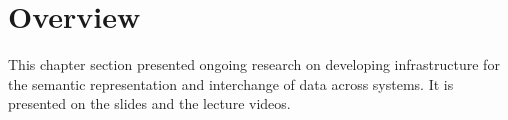 \section{Overview}

This chapter section presented ongoing research on developing infrastructure for the semantic representation and interchange of data across systems.
It is presented on the slides and the lecture videos.

%
%
